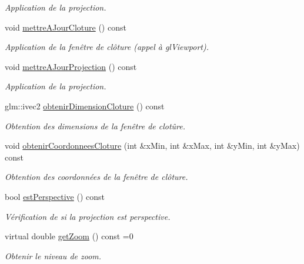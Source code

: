 \begin{DoxyCompactItemize}
\begin{DoxyCompactList}\small\item\em Application de la projection. \end{DoxyCompactList}\item 
void \hyperlink{classvue_1_1_projection_a0a4499967128947206cd3fc34c2b3b20}{mettre\-A\-Jour\-Cloture} () const 
\begin{DoxyCompactList}\small\item\em Application de la fenêtre de clôture (appel à gl\-Viewport). \end{DoxyCompactList}\item 
void \hyperlink{classvue_1_1_projection_abe8290f07564c7b63be04af8c5f68acb}{mettre\-A\-Jour\-Projection} () const 
\begin{DoxyCompactList}\small\item\em Application de la projection. \end{DoxyCompactList}\item 
glm\-::ivec2 \hyperlink{classvue_1_1_projection_aeb123186d5d5816dc09099bfc18f85bf}{obtenir\-Dimension\-Cloture} () const 
\begin{DoxyCompactList}\small\item\em Obtention des dimensions de la fenêtre de clotûre. \end{DoxyCompactList}\item 
void \hyperlink{classvue_1_1_projection_a2e2d21fa9455e872ad27980d0ba80e4b}{obtenir\-Coordonnees\-Cloture} (int \&x\-Min, int \&x\-Max, int \&y\-Min, int \&y\-Max) const 
\begin{DoxyCompactList}\small\item\em Obtention des coordonnées de la fenêtre de clôture. \end{DoxyCompactList}\item 
bool \hyperlink{classvue_1_1_projection_a3d9b70124ec0b3ed22299158abc4067c}{est\-Perspective} () const 
\begin{DoxyCompactList}\small\item\em Vérification de si la projection est perspective. \end{DoxyCompactList}\item 
\hypertarget{classvue_1_1_projection_ae4496535dc6c6441e7ffdb48ae46255d}{virtual double \hyperlink{classvue_1_1_projection_ae4496535dc6c6441e7ffdb48ae46255d}{get\-Zoom} () const =0}\label{classvue_1_1_projection_ae4496535dc6c6441e7ffdb48ae46255d}

\begin{DoxyCompactList}\small\item\em Obtenir le niveau de zoom. \end{DoxyCompactList}\end{DoxyCompactItemize}
